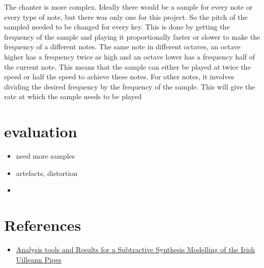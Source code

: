 \documentclass[12pt]{article}
\begin{document}
	The chanter is more complex. Ideally there would be a sample for every note or every type of note, but there was only one
	for this project. So the pitch of the sampled needed to be changed for every key. This is done by getting the frequency of 
	the sample and playing it proportionally faster or slower to make the frequency of a different notes. The same note in 
	different octaves, an octave higher has a frequency twice as high and an octave lower has a frequency half of the current note.
	This means that the sample can either be played at twice the speed or half the speed to achieve these notes. For other notes,
	it involves dividing the desired frequency by the frequency of the sample. This will give the rate at which the sample 
	needs to be played
		
		
\section {evaluation}
\begin{itemize}
	\item need more samples
	\item artefacts, distortion
	\item 
\end{itemize}

 


		
	
	
	
	
	
	\section{References}
	\begin{itemize}
		\item \href{http://mural.maynoothuniversity.ie/4106/}
		{Analysis tools and Results for a Subtractive Synthesis Modelling of the Irish Uilleann Pipes }
		
	\end{itemize}	
		
		
\end{document}
